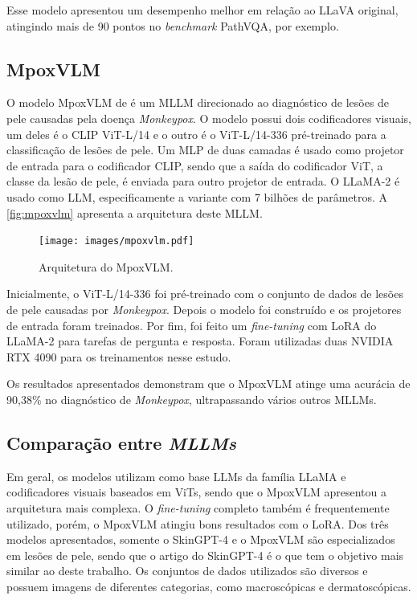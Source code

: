 Esse modelo apresentou um desempenho melhor em relação ao \ac{LLaVA} original, atingindo mais de 90 pontos no
\textit{benchmark} PathVQA, por exemplo.

\subsection{MpoxVLM}

O modelo MpoxVLM de \textcite{cao2024mpoxvlm} é um \ac{MLLM} direcionado ao diagnóstico de lesões de pele causadas pela
doença \textit{Monkeypox}. O modelo possui dois codificadores visuais, um deles é o \ac{CLIP} \ac{ViT}-L/14 e o outro é
o \ac{ViT}-L/14-336 pré-treinado para a classificação de lesões de pele. Um \ac{MLP} de duas camadas é usado como
projetor de entrada para o codificador \ac{CLIP}, sendo que a saída do codificador \ac{ViT}, a classe da lesão de pele,
é enviada para outro projetor de entrada. O \ac{LLaMA}-2 é usado como \ac{LLM}, especificamente a variante com 7
bilhões de parâmetros. A \autoref{fig:mpoxvlm} apresenta a arquitetura deste \ac{MLLM}.

\begin{figure}[ht]
    \centering
    \caption{\small Arquitetura do MpoxVLM.}
    \texttt{[image: images/mpoxvlm.pdf]}
    \label{fig:mpoxvlm}
\end{figure}

Inicialmente, o \ac{ViT}-L/14-336 foi pré-treinado com o conjunto de dados de lesões de pele causadas por
\textit{Monkeypox}. Depois o modelo foi construído e os projetores de entrada foram treinados. Por fim, foi feito um
\textit{fine-tuning} com \ac{LoRA} do \ac{LLaMA}-2 para tarefas de pergunta e resposta. Foram utilizadas duas NVIDIA
RTX 4090 para os treinamentos nesse estudo.

Os resultados apresentados demonstram que o MpoxVLM atinge uma acurácia de 90,38\% no diagnóstico de
\textit{Monkeypox}, ultrapassando vários outros \acp{MLLM}.

\subsection{Comparação entre \textit{MLLMs}} %

Em geral, os modelos utilizam como base \acp{LLM} da família \ac{LLaMA} e codificadores visuais baseados em \acp{ViT},
sendo que o MpoxVLM apresentou a arquitetura mais complexa. O \textit{fine-tuning} completo também é frequentemente
utilizado, porém, o MpoxVLM atingiu bons resultados com o \ac{LoRA}. Dos três modelos apresentados, somente o
Skin\ac{GPT}-4 e o MpoxVLM são especializados em lesões de pele, sendo que o artigo do Skin\ac{GPT}-4 é o que tem o
objetivo mais similar ao deste trabalho. Os conjuntos de dados utilizados são diversos e possuem imagens de diferentes
categorias, como macroscópicas e dermatoscópicas.

